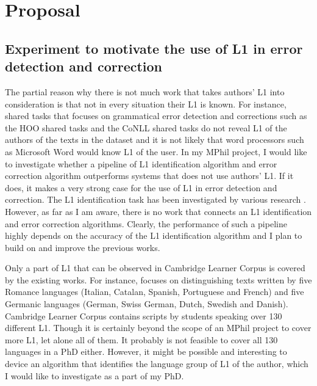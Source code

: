 \documentclass[11pt]{article}
\begin{document}
\section{Proposal}
\subsection{Experiment to motivate the use of L1 in error detection and 
correction}
\label{sub:experiment}
The partial reason why there is not much work that takes authors' L1 into 
consideration is that not in every situation their L1 is known. For instance, 
shared tasks that focuses on grammatical error detection and corrections such as 
the HOO shared tasks and the CoNLL shared tasks do not reveal L1 of the authors 
of the texts in the dataset and it is not likely that word processors such as 
Microsoft Word would know L1 of the user. In my MPhil project, I would like to 
investigate whether a pipeline of L1 identification algorithm and error 
correction algorithm outperforms systems that does not use authors' L1. If it 
does, it makes a very strong case for the use of L1 in error detection and 
correction. The L1 identification task has been investigated by various research 
\citep{estival2007author, tomokiyo2001you, koppel2005determining, 
koppel2005automatically, wong2009contrastive, kochmar2011identification}. 
However, as far as I am aware, there is no work that connects an L1 
identification and error correction algorithms. Clearly, the performance of such 
a pipeline highly depends on the accuracy of the L1 identification algorithm and 
I plan to build on and improve the previous works.

Only a part of L1 that can be observed in Cambridge Learner Corpus is covered by 
the existing works. For instance, \cite{kochmar2011identification} focuses on 
distinguishing texts written by five Romance languages (Italian, Catalan, 
Spanish, Portuguese and French) and five Germanic languages (German, Swiss 
German, Dutch, Swedish and Danish). Cambridge Learner Corpus contains scripts by 
students speaking over 130 different L1. Though it is certainly beyond the scope 
of an MPhil project to cover more L1, let alone all of them. It probably is not 
feasible to cover all 130 languages in a PhD either. However, it might be 
possible and interesting to device an algorithm that identifies the language 
group of L1 of the author, which I would like to investigate as a part of my 
PhD.
\end{document}
